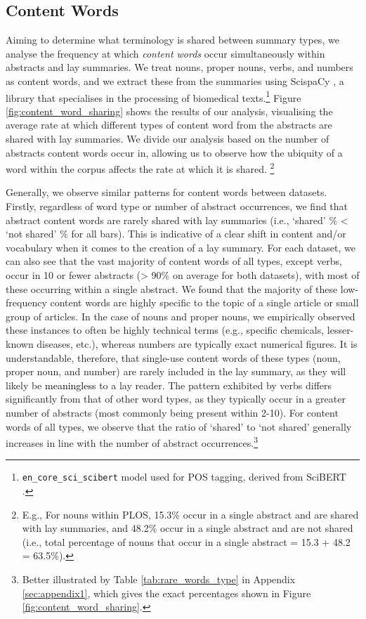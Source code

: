 \documentclass[11pt]{article}
\begin{document}
\subsection{Content Words}  \label{subsec:analysis-content}
Aiming to determine 
what terminology is
shared between summary types, we analyse the frequency at which \textit{content words} occur simultaneously within abstracts and lay summaries.  
We treat nouns, proper nouns, verbs, and numbers as content words, and we extract these from the summaries using ScispaCy \citep{neumann-etal-2019-scispacy}, a library that specialises in the processing of biomedical texts.\footnote{\texttt{en\_core\_sci\_scibert} model used for POS tagging, derived from SciBERT \citep{Beltagy2019-yc}.} 
Figure \ref{fig:content_word_sharing} shows the results of our analysis, visualising the average rate at which different types of content word from the abstracts are shared with lay summaries.
We divide our analysis based on the number of abstracts content words occur in, allowing us to observe how the ubiquity of a word within the corpus affects the rate at which it is shared.
\footnote{E.g., For nouns within \textsc{PLOS}, 15.3\% occur in a single abstract and are shared with lay summaries, and 48.2\% occur in a single abstract and are not shared (i.e., total percentage of nouns that occur in a single abstract = 15.3 + 48.2 = 63.5\%).}

Generally, we observe similar patterns for content words between datasets. 
Firstly, regardless of word type or number of abstract occurrences, we find that abstract content words are rarely shared with lay summaries (i.e., `shared' \% < `not shared' \% for all bars).
This is indicative of a clear shift in content and/or vocabulary when it comes to the creation of a lay summary.  
For each dataset, we can also see that the vast majority of content words of all types, except verbs, occur in 10 or fewer abstracts (> 90\% on average for both datasets), with most of these occurring within a single abstract. 
We found that the majority of these low-frequency content words are highly specific to the topic of a single article or small group of articles. In the case of nouns and proper nouns, we empirically observed these instances to often be highly technical terms (e.g., specific chemicals, lesser-known diseases, etc.), whereas numbers are typically exact numerical figures. It is understandable, therefore, that single-use content words of these types (noun, proper noun, and number) are rarely included in the lay summary, as they will likely be \textcolor{black}{meaningless} to a lay reader. 
The pattern exhibited by verbs differs significantly from that of other word types, as they typically occur in a greater number of abstracts (most commonly being present within 2-10).
For content words of all types, we observe that the ratio of `shared' to `not shared' generally increases in line with the number of abstract occurrences.\footnote{Better illustrated by Table \ref{tab:rare_words_type} in Appendix \ref{sec:appendix1}, which gives the exact percentages shown in Figure \ref{fig:content_word_sharing}.}
\end{document}
